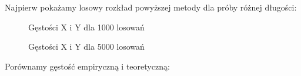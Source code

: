 \documentclass{article}
\begin{document}
\begin{enumerate}
		Najpierw pokażamy losowy rozkład powyższej metody dla próby różnej długości:
		\begin{figure}[h]
			\begin{center}
				\caption{Gęstości X i Y dla 1000 losowań}
				\caption{Gęstości X i Y dla 5000 losowań}
			\end{center}
		\end{figure}
		Porównamy gęstość empiryczną i teoretyczną:
		\begin{figure}[h]
			\begin{center}
\end{center}
\end{figure}
\end{enumerate}
\end{document}
